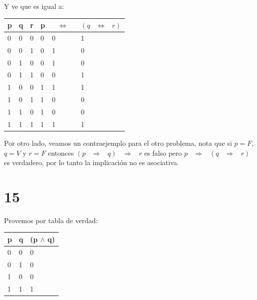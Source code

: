 \documentclass[12pt, fleqn]{article}                            %
\DeclareMathOperator \Space     {\quad}                         %
\DeclareMathOperator \MiniSpace {\;}                            %
\theoremstyle{break}                                            %
\newcommand \lEqual  {\MiniSpace \Leftrightarrow \MiniSpace}    %
\newcommand \lInfire {\MiniSpace \Rightarrow \MiniSpace}        %
\begin{document}
    Y ve que es igual a: \\
        \begin{tabular}{|l|l|l|l|l|l|} 
        \hline
        p & q & r & p   & $\lEqual$   & $(q \lEqual r)$  \\ \hline
        0 & 0 & 0 & 0   &   0        &     1          \\ \hline 
        0 & 0 & 1 & 0   &   1        &     0          \\ \hline 
        0 & 1 & 0 & 0   &   1        &     0          \\ \hline 
        0 & 1 & 1 & 0   &   0        &     1          \\ \hline 
        1 & 0 & 0 & 1   &   1        &     1          \\ \hline 
        1 & 0 & 1 & 1   &   0        &     0          \\ \hline 
        1 & 1 & 0 & 1   &   0        &     0          \\ \hline 
        1 & 1 & 1 & 1   &   1        &     1          \\ \hline 
    \end{tabular}

    Por otro lado, veamos un contraejemplo para el otro problema, 
    nota que si $p = F$, $q = V$ y $r = F$ 
    entonces $(p \lInfire q) \lInfire r$ es falso pero $p \lInfire (q \lInfire r)$
    es verdadero, por lo tanto la implicación no es asociativa.




\clearpage
\section{15}

    Provemos por tabla de verdad:\\
    \begin{tabular}{|l|l|l|} 
        \hline
        p & q  & (p $\wedge$ q)   \\ \hline
        0 & 0  &        0         \\ \hline 
        0 & 1  &        0         \\ \hline 
        1 & 0  &        0         \\ \hline 
        1 & 1  &        1         \\ \hline 
    \end{tabular}
\end{document}
